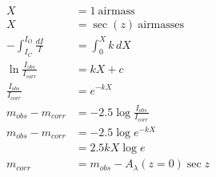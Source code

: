 \documentclass[a4paper,11pt,normalem]{article}
\begin{document}
\begin{align*}
    X &= 1 ~\text{airmass} \\
    X &= \sec(z) ~\text{airmasses} \\
    -\int_{I_C}^{I_O} \frac{dI}{I} &= \int_{0}^{X}k\,dX \\
    \ln{\frac{I_{obs}}{I_{corr}}} &= kX + c \\
    \frac{I_{obs}}{I_{corr}} &= e^{-kX} \\
    m_{obs} - m_{corr} &= -2.5\log{\frac{I_{obs}}{I_{corr}}} \\
    m_{obs} - m_{corr} &= -2.5\log{e^{-kX}} \\
                       &= 2.5kX\log{e} \\
    m_{corr} &= m_{obs} - A_\lambda(z = 0) \sec{z}
\end{align*}
\end{document}
